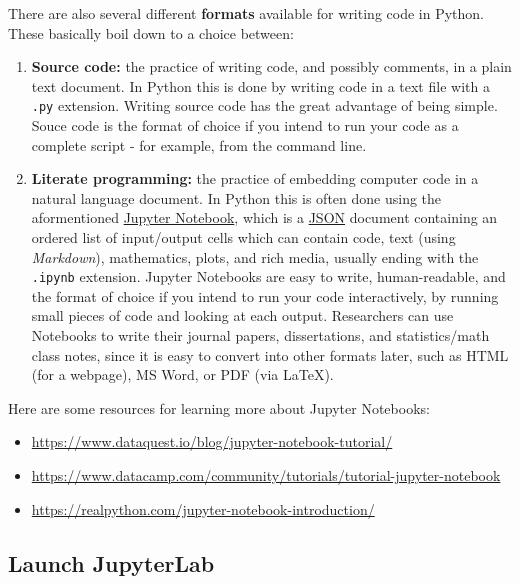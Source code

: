 \documentclass[]{book}
\providecommand{\tightlist}{%
  \setlength{\itemsep}{0pt}\setlength{\parskip}{0pt}}
\begin{document}
There are also several different \textbf{formats} available for writing
code in Python. These basically boil down to a choice between:

\begin{enumerate}
\def\labelenumi{\arabic{enumi}.}
\item
  \textbf{Source code:} the practice of writing code, and possibly
  comments, in a plain text document. In Python this is done by writing
  code in a text file with a \texttt{.py} extension. Writing source code
  has the great advantage of being simple. Souce code is the format of
  choice if you intend to run your code as a complete script - for
  example, from the command line.
\item
  \textbf{Literate programming:} the practice of embedding computer code
  in a natural language document. In Python this is often done using the
  aformentioned \href{https://jupyter.org/}{Jupyter Notebook}, which is
  a \href{https://www.json.org/json-en.html}{JSON} document containing
  an ordered list of input/output cells which can contain code, text
  (using \emph{Markdown}), mathematics, plots, and rich media, usually
  ending with the \texttt{.ipynb} extension. Jupyter Notebooks are easy
  to write, human-readable, and the format of choice if you intend to
  run your code interactively, by running small pieces of code and
  looking at each output. Researchers can use Notebooks to write their
  journal papers, dissertations, and statistics/math class notes, since
  it is easy to convert into other formats later, such as HTML (for a
  webpage), MS Word, or PDF (via LaTeX).
\end{enumerate}

Here are some resources for learning more about Jupyter Notebooks:

\begin{itemize}
\tightlist
\item
  \url{https://www.dataquest.io/blog/jupyter-notebook-tutorial/}
\item
  \url{https://www.datacamp.com/community/tutorials/tutorial-jupyter-notebook}
\item
  \url{https://realpython.com/jupyter-notebook-introduction/}
\end{itemize}

\subsection{Launch JupyterLab}\label{launch-jupyterlab-1}
\end{document}
